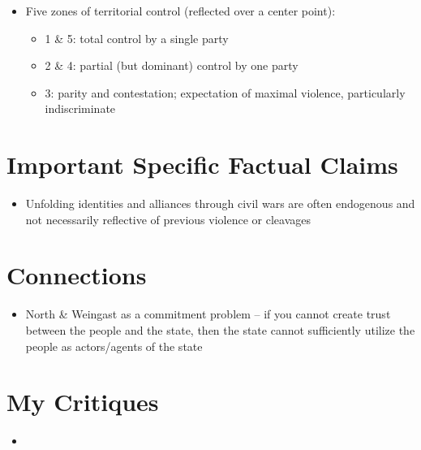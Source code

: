 \documentclass[12pt]{article}
\begin{document}
\begin{itemize}[leftmargin=*, itemsep=4pt]
    \item Five zones of territorial control (reflected over a center point):
    \begin{itemize}
        \item 1 \& 5: total control by a single party
        \item 2 \& 4: partial (but dominant) control by one party
        \item 3: parity and contestation; expectation of maximal violence, particularly indiscriminate
    \end{itemize}
\end{itemize}


\section{Important Specific Factual Claims}

\begin{itemize}[leftmargin=*, itemsep=4pt]
    \item Unfolding identities and alliances through civil wars are often endogenous and not necessarily reflective of previous violence or cleavages
\end{itemize}


\section{Connections}

\begin{itemize}
    \item North \& Weingast as a commitment problem -- if you cannot create trust between the people and the state, then the state cannot sufficiently utilize the people as actors/agents of the state
\end{itemize}


\section{My Critiques}

\begin{itemize}
    \item
\end{itemize}
\end{document}
